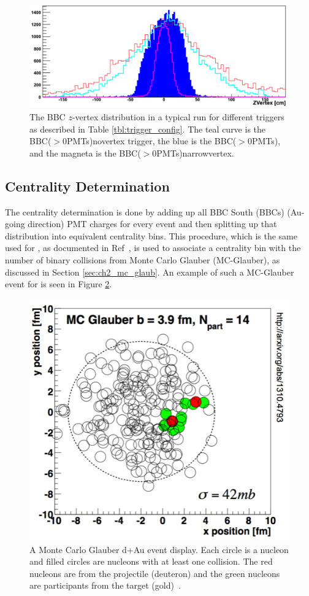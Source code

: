 \begin{figure}[h!]
\centering
\includegraphics[width=0.65\linewidth]{figs/bbc_z_vertex_dist.png}
\caption{The BBC $z$-vertex distribution in a typical \pau run for different triggers as described in Table \ref{tbl:trigger_config}.  The teal curve is the BBC($>$0\thinspace PMTs)\thinspace novertex trigger, the blue is the BBC($>$0\thinspace PMTs), and the magneta is the BBC($>$0\thinspace PMTs)\thinspace narrowvertex.}
\label{fig:bbc_z_vtx_dist}
\end{figure}

\subsection{Centrality Determination}
\label{sec:central_determin}
The centrality determination is done by adding up all BBC South (BBCs) (Au-going direction) PMT charges for every event and then splitting up that distribution into equivalent centrality bins. This procedure, which is the same used for \dau, as documented in Ref~\cite{PhysRevC.90.034902}, is used to associate a centrality bin with the number of binary collisions from Monte Carlo Glauber (MC-Glauber), as discussed in Section \ref{sec:ch2_mc_glaub}. An example of such a MC-Glauber event for \dau is seen in Figure \ref{fig:glauber_event_display}.  
\label{centrality_determination}
\begin{figure}[!ht]
\centering
\includegraphics[width=0.5\linewidth]{figs/glauber_event_display.png}
\caption{A Monte Carlo Glauber d+Au event display. Each circle is a nucleon and filled circles are nucleons with at least one collision. The red nucleons are from the projectile (deuteron) and the green nucleons are participants from the target (gold)~\cite{PhysRevC.90.034902}.}
\label{fig:glauber_event_display}
\end{figure}


